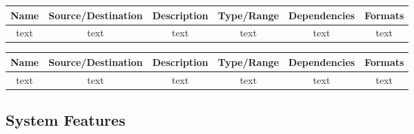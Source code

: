 \documentclass[twoside,letterpaper]{article}
\begin{document}
\bigskip

\begin{minipage}{\linewidth}
\centering
{}
\begin{tabular}{c c c c c c } \toprule[1.5pt]
\bf Name & \bf Source/Destination & \bf Description & \bf Type/Range & \bf Dependencies & \bf Formats\\ \toprule[1.0pt]
 text & text & text & text & text & text \\
\bottomrule[1.5pt]
\end {tabular} %
\end{minipage}

\bigskip

\begin{minipage}{\linewidth}
\centering
{}
\begin{tabular}{c c c c c c } \toprule[1.5pt]
\bf Name & \bf Source/Destination & \bf Description & \bf Type/Range & \bf Dependencies & \bf Formats\\ \toprule[1.0pt]
 text & text & text & text & text & text \\
\bottomrule[1.5pt]
\end {tabular}\par
\end{minipage}

\clearpage %
\subsection{System Features}
\end{document}
